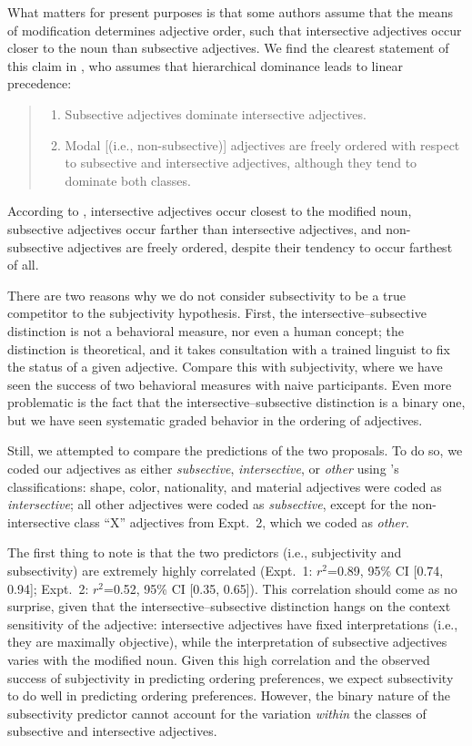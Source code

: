 \documentclass[12pt]{article}
\newcommand{\ben}{\begin{enumerate}}
\newcommand{\een}{\end{enumerate}}
\begin{document}
What matters for present purposes is that some authors assume that the means of modification determines adjective order, such that intersective adjectives occur closer to the noun than subsective adjectives. We find the clearest statement of this claim in \cite{truswell2009}, who assumes that hierarchical dominance leads to linear precedence:

\begin{quotation}
\noindent\ben
	\item Subsective adjectives dominate intersective adjectives. \item Modal [(i.e., non-subsective)] adjectives are freely ordered with respect to subsective and intersective adjectives, although they tend to dominate both classes.
	\een
\end{quotation}

\noindent According to \citeauthor{truswell2009}, intersective adjectives occur closest to the modified noun, subsective adjectives occur farther than intersective adjectives, and non-subsective adjectives are freely ordered, despite their tendency to occur farthest of all. 

There are two reasons why we do not consider subsectivity to be a true competitor to the subjectivity hypothesis. First, the intersective--subsective distinction is not a behavioral measure, nor even a human concept; the distinction is theoretical, and it takes consultation with a trained linguist to fix the status of a given adjective. Compare this with subjectivity, where we have seen the success of two behavioral measures with naive participants. Even more problematic is the fact that the intersective--subsective distinction is a binary one, but we have seen systematic graded behavior in the ordering of adjectives.

Still, we attempted to compare the predictions of the two proposals. To do so, we coded our adjectives as either \emph{subsective}, \emph{intersective}, or \emph{other} using \citeauthor{truswell2009}'s classifications: shape, color, nationality, and material adjectives were coded as \emph{intersective}; all other adjectives were coded as \emph{subsective}, except for the non-intersective class ``X'' adjectives from Expt.~2, which we coded as \emph{other}.

The first thing to note is that the two predictors (i.e., subjectivity and subsectivity) are extremely highly correlated (Expt.~1: $r^2${=}0.89, 95\% CI [0.74,  0.94]; Expt.~2: $r^2${=}0.52, 95\% CI [0.35,  0.65]). This correlation should come as no surprise, given that the intersective--subsective distinction hangs on the context sensitivity of the adjective: intersective adjectives have fixed interpretations (i.e., they are maximally objective), while the interpretation of subsective adjectives varies with the modified noun. Given this high correlation and the observed success of subjectivity in predicting ordering preferences, we expect subsectivity to do well in predicting ordering preferences. However, the binary nature of the subsectivity predictor cannot account for the variation \emph{within} the classes of subsective and intersective adjectives. 
\end{document}

